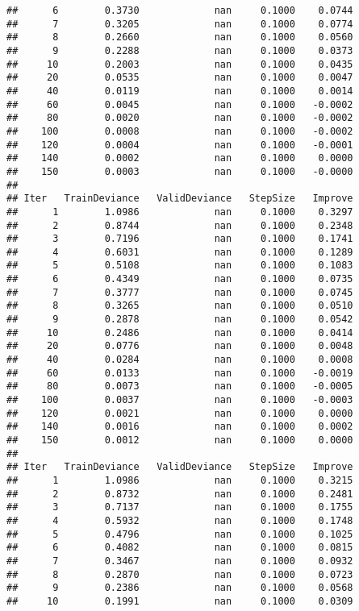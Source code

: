\documentclass[
]{article}
\begin{document}
\begin{verbatim}
##      6        0.3730             nan     0.1000    0.0744
##      7        0.3205             nan     0.1000    0.0774
##      8        0.2660             nan     0.1000    0.0560
##      9        0.2288             nan     0.1000    0.0373
##     10        0.2003             nan     0.1000    0.0435
##     20        0.0535             nan     0.1000    0.0047
##     40        0.0119             nan     0.1000    0.0014
##     60        0.0045             nan     0.1000   -0.0002
##     80        0.0020             nan     0.1000   -0.0002
##    100        0.0008             nan     0.1000   -0.0002
##    120        0.0004             nan     0.1000   -0.0001
##    140        0.0002             nan     0.1000    0.0000
##    150        0.0003             nan     0.1000   -0.0000
## 
## Iter   TrainDeviance   ValidDeviance   StepSize   Improve
##      1        1.0986             nan     0.1000    0.3297
##      2        0.8744             nan     0.1000    0.2348
##      3        0.7196             nan     0.1000    0.1741
##      4        0.6031             nan     0.1000    0.1289
##      5        0.5108             nan     0.1000    0.1083
##      6        0.4349             nan     0.1000    0.0735
##      7        0.3777             nan     0.1000    0.0745
##      8        0.3265             nan     0.1000    0.0510
##      9        0.2878             nan     0.1000    0.0542
##     10        0.2486             nan     0.1000    0.0414
##     20        0.0776             nan     0.1000    0.0048
##     40        0.0284             nan     0.1000    0.0008
##     60        0.0133             nan     0.1000   -0.0019
##     80        0.0073             nan     0.1000   -0.0005
##    100        0.0037             nan     0.1000   -0.0003
##    120        0.0021             nan     0.1000    0.0000
##    140        0.0016             nan     0.1000    0.0002
##    150        0.0012             nan     0.1000    0.0000
## 
## Iter   TrainDeviance   ValidDeviance   StepSize   Improve
##      1        1.0986             nan     0.1000    0.3215
##      2        0.8732             nan     0.1000    0.2481
##      3        0.7137             nan     0.1000    0.1755
##      4        0.5932             nan     0.1000    0.1748
##      5        0.4796             nan     0.1000    0.1025
##      6        0.4082             nan     0.1000    0.0815
##      7        0.3467             nan     0.1000    0.0932
##      8        0.2870             nan     0.1000    0.0723
##      9        0.2386             nan     0.1000    0.0568
##     10        0.1991             nan     0.1000    0.0309

\end{verbatim}
\end{document}

